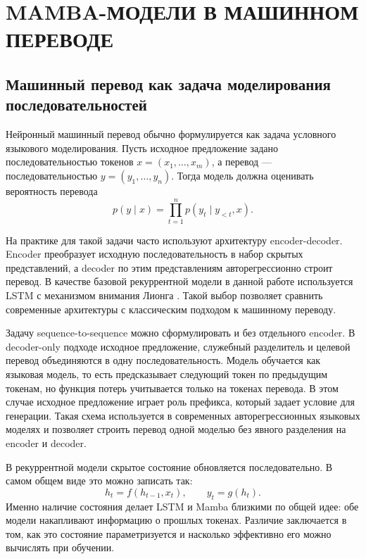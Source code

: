 \section{MAMBA-МОДЕЛИ В МАШИННОМ ПЕРЕВОДЕ}

\subsection{Машинный перевод как задача моделирования последовательностей}

Нейронный машинный перевод обычно формулируется как задача условного языкового моделирования.
Пусть исходное предложение задано последовательностью токенов
$x = (x_1, \ldots, x_m)$, а перевод --- последовательностью
$y = (y_1, \ldots, y_n)$.
Тогда модель должна оценивать вероятность перевода
\begin{equation}
    p(y \mid x) = \prod_{t=1}^{n} p(y_t \mid y_{<t}, x).
\end{equation}

На практике для такой задачи часто используют архитектуру encoder-decoder.
Encoder преобразует исходную последовательность в набор скрытых представлений, а decoder по этим представлениям авторегрессионно строит перевод.
В качестве базовой рекуррентной модели в данной работе используется LSTM с механизмом внимания Лионга \cite{luong}.
Такой выбор позволяет сравнить современные архитектуры с классическим подходом к машинному переводу.

Задачу sequence-to-sequence можно сформулировать и без отдельного encoder.
В decoder-only подходе исходное предложение, служебный разделитель и целевой перевод объединяются в одну последовательность.
Модель обучается как языковая модель, то есть предсказывает следующий токен по предыдущим токенам, но функция потерь учитывается только на токенах перевода.
В этом случае исходное предложение играет роль префикса, который задает условие для генерации.
Такая схема используется в современных авторегрессионных языковых моделях и позволяет строить перевод одной моделью без явного разделения на encoder и decoder.

В рекуррентной модели скрытое состояние обновляется последовательно.
В самом общем виде это можно записать так:
\begin{equation}
    h_t = f(h_{t-1}, x_t), \qquad y_t = g(h_t).
\end{equation}
Именно наличие состояния делает LSTM и Mamba близкими по общей идее: обе модели накапливают информацию о прошлых токенах.
Различие заключается в том, как это состояние параметризуется и насколько эффективно его можно вычислять при обучении.

